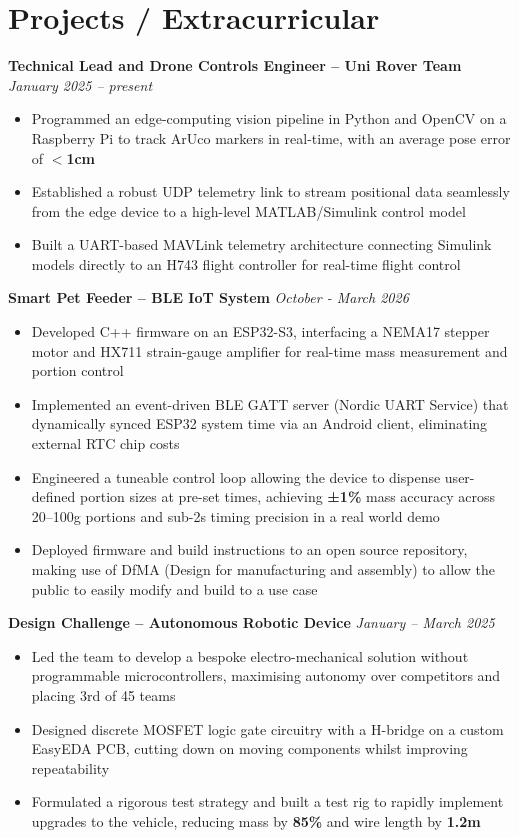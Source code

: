 \documentclass[a4paper,10pt]{article} %
\begin{document}
\section*{Projects / Extracurricular}
\noindent\textbf{Technical Lead and Drone Controls Engineer – Uni Rover Team} \hfill \textit{January 2025 – present}
\begin{itemize}
    \item Programmed an edge-computing vision pipeline in Python and OpenCV on a Raspberry Pi to track ArUco markers in real-time, with an average pose error of \textbf{$<$1cm}
    \item Established a robust UDP telemetry link to stream positional data seamlessly from the edge device to a high-level MATLAB/Simulink control model
    \item Built a UART-based MAVLink telemetry architecture connecting Simulink models directly to an H743 flight controller for real-time flight control
\end{itemize}
\vspace{0.75em}
\noindent\textbf{Smart Pet Feeder – BLE IoT System} \hfill \textit{October - March 2026}
\begin{itemize}
    \item Developed C++ firmware on an ESP32-S3, interfacing a NEMA17 stepper motor and HX711 strain-gauge amplifier for real-time mass measurement and portion control   
    \item Implemented an event-driven BLE GATT server (Nordic UART Service) that dynamically synced ESP32 system time via an Android client, eliminating external RTC chip costs
    \item Engineered a tuneable control loop allowing the device to dispense user-defined portion sizes at pre-set times, achieving \textbf{±1\%} mass accuracy across 20–100g portions and sub-2s timing precision in a real world demo
    \item Deployed firmware and build instructions to an open source repository, making use of DfMA (Design for manufacturing and assembly) to allow the public to easily modify and build to a use case
\end{itemize}
\vspace{0.75em}
\noindent\textbf{ Design Challenge – Autonomous Robotic Device} \hfill \textit{January – March 2025}
\begin{itemize}
    \item Led the team to develop a bespoke electro-mechanical solution without programmable microcontrollers, maximising autonomy over competitors and placing 3rd of 45 teams
    \item Designed discrete MOSFET logic gate circuitry with a H-bridge on a custom EasyEDA PCB, cutting down on moving components whilst improving repeatability
    \item Formulated a rigorous test strategy and built a test rig to rapidly implement upgrades to the vehicle, reducing mass by \textbf{85\%} and wire length by \textbf{1.2m}
\end{itemize}
\end{document}
